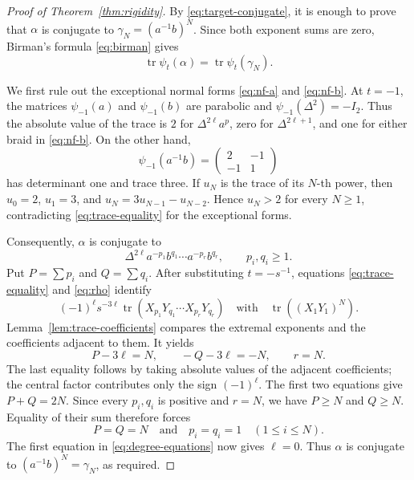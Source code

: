 \documentclass[10pt,a4paper]{amsart}
\newcommand{\tr}{\operatorname{tr}}
\begin{document}
\begin{proof}[Proof of Theorem~\ref{thm:rigidity}]
By \eqref{eq:target-conjugate}, it is enough to prove that \(\alpha\) is conjugate to
\(\gamma_N=(a^{-1}b)^N\).  Since both exponent sums are zero, Birman's formula
\eqref{eq:birman} gives
\begin{equation}\label{eq:trace-equality}
  \tr\psi_t(\alpha)=\tr\psi_t(\gamma_N).
\end{equation}

We first rule out the exceptional normal forms \eqref{eq:nf-a} and
\eqref{eq:nf-b}.  At \(t=-1\), the matrices \(\psi_{-1}(a)\) and
\(\psi_{-1}(b)\) are parabolic and \(\psi_{-1}(\Delta^2)=-I_2\).  Thus the
absolute value of the trace is \(2\) for \(\Delta^{2\ell}a^p\), zero for
\(\Delta^{2\ell+1}\), and one for either braid in \eqref{eq:nf-b}.  On the other
hand,
\[
  \psi_{-1}(a^{-1}b)
  =\begin{pmatrix}2&-1\\-1&1\end{pmatrix}
\]
has determinant one and trace three.  If \(u_N\) is the trace of its \(N\)-th
power, then \(u_0=2\), \(u_1=3\), and
\(u_N=3u_{N-1}-u_{N-2}\).  Hence \(u_N>2\) for every \(N\geq1\), contradicting
\eqref{eq:trace-equality} for the exceptional forms.

Consequently, \(\alpha\) is conjugate to
\[
  \Delta^{2\ell}a^{-p_1}b^{q_1}\cdots a^{-p_r}b^{q_r},
  \qquad p_i,q_i\geq1.
\]
Put \(P=\sum p_i\) and \(Q=\sum q_i\).  After substituting \(t=-s^{-1}\),
equations \eqref{eq:trace-equality} and \eqref{eq:rho} identify
\[
  (-1)^\ell s^{-3\ell}
  \tr(X_{p_1}Y_{q_1}\cdots X_{p_r}Y_{q_r})
  \quad\text{with}\quad
  \tr((X_1Y_1)^N).
\]
Lemma~\ref{lem:trace-coefficients} compares the extremal exponents and the
coefficients adjacent to them.  It yields
\begin{equation}\label{eq:degree-equations}
  P-3\ell=N,
  \qquad -Q-3\ell=-N,
  \qquad r=N.
\end{equation}
The last equality follows by taking absolute values of the adjacent coefficients;
the central factor contributes only the sign \((-1)^\ell\).  The first two equations
give \(P+Q=2N\).  Since every \(p_i,q_i\) is positive and \(r=N\), we have
\(P\geq N\) and \(Q\geq N\).  Equality of their sum therefore forces
\[
  P=Q=N
  \quad\text{and}\quad
  p_i=q_i=1\quad(1\leq i\leq N).
\]
The first equation in \eqref{eq:degree-equations} now gives \(\ell=0\).  Thus
\(\alpha\) is conjugate to \((a^{-1}b)^N=\gamma_N\), as required.
\end{proof}
\end{document}
